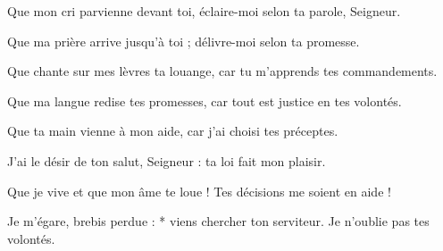 \item Que mon cri parvienne devant toi, éclaire-moi selon ta parole, Seigneur.

\item Que ma prière arrive jusqu'à toi ; délivre-moi selon ta promesse.

\item Que chante sur mes lèvres ta louange, car tu m'apprends tes commandements.

\item Que ma langue redise tes promesses, car tout est justice en tes volontés.

\item Que ta main vienne à mon aide, car j'ai choisi tes préceptes.

\item J'ai le désir de ton salut, Seigneur : ta loi fait mon plaisir.

\item Que je vive et que mon âme te loue ! Tes décisions me soient en aide !

\item Je m'égare, brebis perdue : * viens chercher ton serviteur. Je n'oublie pas tes volontés.

